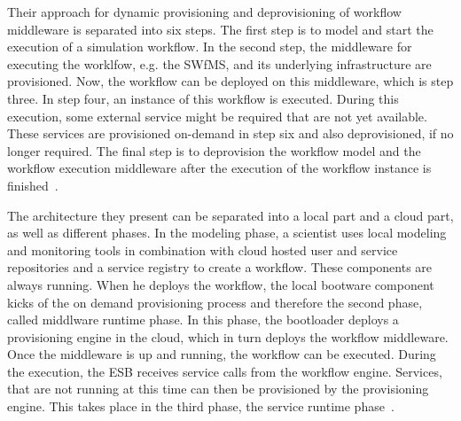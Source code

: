 Their approach for dynamic provisioning and deprovisioning of workflow middleware is separated into six steps. The first step is to model and start the execution of a simulation workflow. In the second step, the middleware for executing the worklfow, e.g. the SWfMS, and its underlying infrastructure are provisioned. Now, the workflow can be deployed on this middleware, which is step three. In step four, an instance of this workflow is executed. During this execution, some external service might be required that are not yet available. These services are provisioned on-demand in step six and also deprovisioned, if no longer required. The final step is to deprovision the workflow model and the workflow execution middleware after the execution of the workflow instance is finished~\autocite{provisioning:ondemand}.

The architecture they present can be separated into a local part and a cloud part, as well as different phases. In the modeling phase, a scientist uses local modeling and monitoring tools in combination with cloud hosted user and service repositories and a service registry to create a workflow. These components are always running. When he deploys the workflow, the local bootware component kicks of the on demand provisioning process and therefore the second phase, called middlware runtime phase. In this phase, the bootloader deploys a provisioning engine in the cloud, which in turn deploys the workflow middleware. Once the middleware is up and running, the workflow can be executed. During the execution, the ESB receives service calls from the workflow engine. Services, that are not running at this time can then be provisioned by the provisioning engine. This takes place in the third phase, the service runtime phase~\autocite{provisioning:ondemand}.
